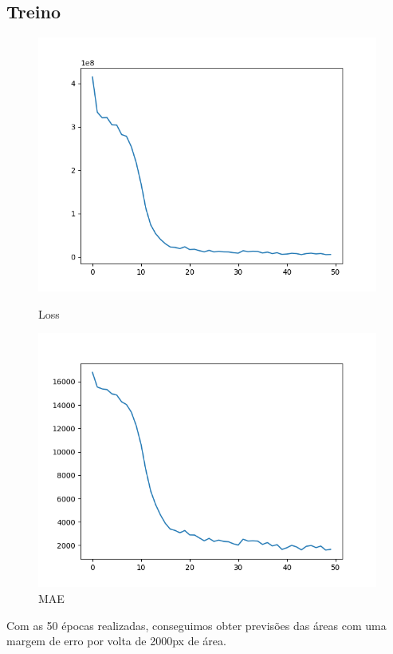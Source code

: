 \subsection{Treino}
	\begin{figure}[H]
	    \centering
	      \includegraphics[width=1.0\linewidth]{imgs/Test_8/loss.png}
	    \caption{Loss}
	        \includegraphics[width=1.0\linewidth]{imgs/Test_8/mae.png}
	    \caption{MAE}
	    \label{fig:sub2}
	\end{figure}
	  Com as 50 épocas realizadas, conseguimos obter previsões das áreas com uma margem de erro por volta de 2000px de área.
	
